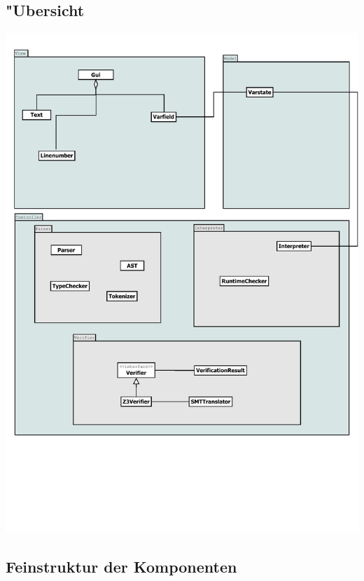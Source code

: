 \documentclass[10pt,a4paper,titlepage]{article}
\begin{document}
\subsection{"Ubersicht}
\includegraphics[scale=0.8]{images/ClassOverview.pdf}
\subsection{Feinstruktur der Komponenten}
\end{document}
